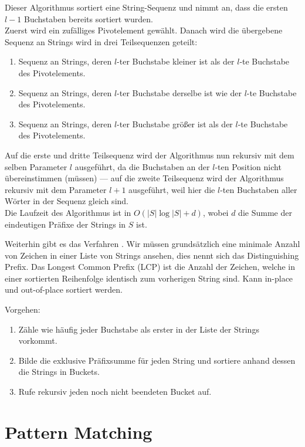 Dieser Algorithmus sortiert eine String-Sequenz und nimmt an, dass die ersten \( l-1 \) Buchstaben bereits sortiert wurden. \\
Zuerst wird ein zufälliges Pivotelement gewählt. Danach wird die übergebene Sequenz an Strings wird in drei Teilsequenzen geteilt:
\begin{enumerate}
  \item Sequenz an Strings, deren \( l \)-ter Buchstabe kleiner ist als der \( l \)-te Buchstabe des Pivotelements.
  \item Sequenz an Strings, deren \( l \)-ter Buchstabe derselbe ist wie der \( l \)-te Buchstabe des Pivotelements.
  \item Sequenz an Strings, deren \( l \)-ter Buchstabe größer ist als der \( l \)-te Buchstabe des Pivotelements.
\end{enumerate}
Auf die erste und dritte Teilsequenz wird der Algorithmus nun rekursiv mit dem selben Parameter \( l \) ausgeführt, da die Buchstaben an der \( l \)-ten Position nicht übereinstimmen (müssen) --- auf die zweite Teilsequenz wird der Algorithmus rekursiv mit dem Parameter \( l+1 \) ausgeführt, weil hier die \( l \)-ten Buchstaben aller Wörter in der Sequenz gleich sind. \\
Die Laufzeit des Algorithmus ist in \( O(\left\vert S \right\vert \log \left\vert S \right\vert + d) \), wobei \( d \) die Summe der eindeutigen Präfixe der Strings in \( S \) ist.

Weiterhin gibt es das Verfahren . Wir müssen grundsätzlich eine minimale Anzahl von Zeichen in einer Liste von Strings ansehen, dies nennt sich das Distinguishing Prefix. Das Longest Common Prefix (LCP) ist die Anzahl der Zeichen, welche in einer sortierten Reihenfolge identisch zum vorherigen String sind.
Kann in-place und out-of-place sortiert werden.

Vorgehen:
\begin{enumerate}
	\item Zähle wie häufig jeder Buchstabe als erster in der Liste der Strings vorkommt.
	\item Bilde die exklusive Präfixsumme für jeden String und sortiere anhand dessen die Strings in Buckets.
	\item Rufe rekursiv jeden noch nicht beendeten Bucket auf.
\end{enumerate}

\section{Pattern Matching}\label{sec:patternMatching}

